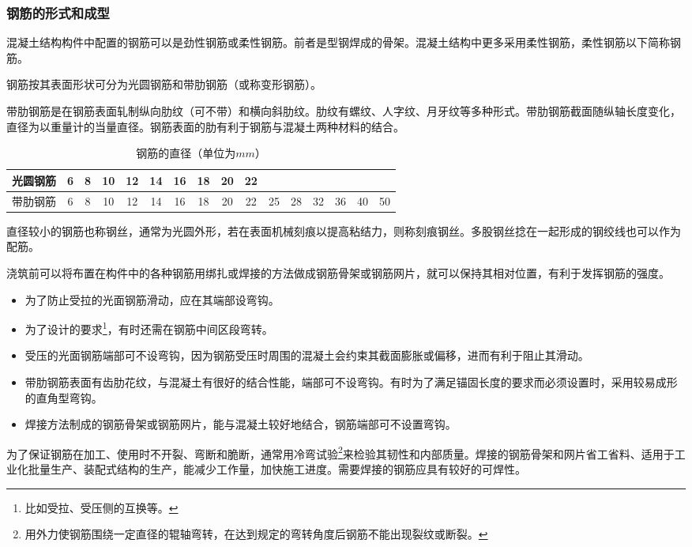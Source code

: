\documentclass{article}
\begin{document}
\subsubsection{钢筋的形式和成型}
\par 混凝土结构构件中配置的钢筋可以是劲性钢筋或柔性钢筋。前者是型钢焊成的骨架。混凝土结构中更多采用柔性钢筋，柔性钢筋以下简称钢筋。
\par 钢筋按其表面形状可分为光圆钢筋和带肋钢筋（或称变形钢筋）。
\par 带肋钢筋是在钢筋表面轧制纵向肋纹（可不带）和横向斜肋纹。肋纹有螺纹、人字纹、月牙纹等多种形式。带肋钢筋截面随纵轴长度变化，直径为以重量计的当量直径。钢筋表面的肋有利于钢筋与混凝土两种材料的结合。
\begin{table}[htbp]
      \caption{钢筋的直径（单位为$mm$）}
      \begin{center}
            \begin{tabular}{|c|ccccccccc|cccccc|}
                  \hline
                  光圆钢筋 & 6 & 8 & 10 & 12 & 14 & 16 & 18 & 20 & 22 &    &    &    &    &    &    \\
                  \hline
                  带肋钢筋 & 6 & 8 & 10 & 12 & 14 & 16 & 18 & 20 & 22 & 25 & 28 & 32 & 36 & 40 & 50 \\
                  \hline
            \end{tabular}
      \end{center}
\end{table}
\par 直径较小的钢筋也称钢丝，通常为光圆外形，若在表面机械刻痕以提高粘结力，则称刻痕钢丝。多股钢丝捻在一起形成的钢绞线也可以作为配筋。
\par 浇筑前可以将布置在构件中的各种钢筋用绑扎或焊接的方法做成钢筋骨架或钢筋网片，就可以保持其相对位置，有利于发挥钢筋的强度。
\begin{itemize}
      \item 为了防止受拉的光面钢筋滑动，应在其端部设弯钩。
      \item 为了设计的要求\footnote{比如受拉、受压侧的互换等。}，有时还需在钢筋中间区段弯转。
      \item 受压的光面钢筋端部可不设弯钩，因为钢筋受压时周围的混凝土会约束其截面膨胀或偏移，进而有利于阻止其滑动。
      \item 带肋钢筋表面有齿肋花纹，与混凝土有很好的结合性能，端部可不设弯钩。有时为了满足锚固长度的要求而必须设置时，采用较易成形的直角型弯钩。
      \item 焊接方法制成的钢筋骨架或钢筋网片，能与混凝土较好地结合，钢筋端部可不设置弯钩。
\end{itemize}
\par 为了保证钢筋在加工、使用时不开裂、弯断和脆断，通常用冷弯试验\footnote{用外力使钢筋围绕一定直径的辊轴弯转，在达到规定的弯转角度后钢筋不能出现裂纹或断裂。}来检验其韧性和内部质量。焊接的钢筋骨架和网片省工省料、适用于工业化批量生产、装配式结构的生产，能减少工作量，加快施工进度。需要焊接的钢筋应具有较好的可焊性。
\end{document}
